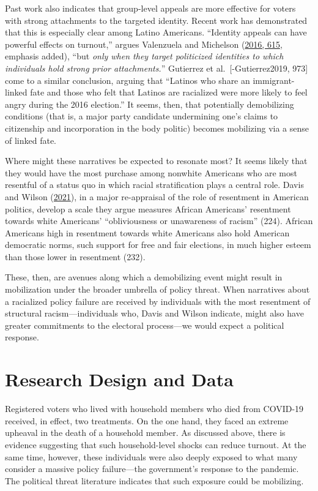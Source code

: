 \documentclass[
  12pt,
]{article}
\begin{document}
Past work also indicates that group-level appeals are more effective for voters with strong attachments to the targeted identity. Recent work has demonstrated that this is especially clear among Latino Americans. ``Identity appeals can have powerful effects on turnout,'' argues Valenzuela and Michelson (\protect\hyperlink{ref-Valenzuela2016}{2016, 615}, emphasis added), ``but \emph{only when they target politicized identities to which individuals hold strong prior attachments.}'' Gutierrez et al.~{[}-Gutierrez2019, 973{]} come to a similar conclusion, arguing that ``Latinos who share an immigrant-linked fate and those who felt that Latinos are racialized were more likely to feel angry during the 2016 election.'' It seems, then, that potentially demobilizing conditions (that is, a major party candidate undermining one's claims to citizenship and incorporation in the body politic) becomes mobilizing via a sense of linked fate.

Where might these narratives be expected to resonate most? It seems likely that they would have the most purchase among nonwhite Americans who are most resentful of a status quo in which racial stratification plays a central role. Davis and Wilson (\protect\hyperlink{ref-Davis2021}{2021}), in a major re-appraisal of the role of resentment in American politics, develop a scale they argue measures African Americans' resentment towards white Americans' ``obliviousness or unawareness of racism'' (224). African Americans high in resentment towards white Americans also hold American democratic norms, such support for free and fair elections, in much higher esteem than those lower in resentment (232).

These, then, are avenues along which a demobilizing event might result in mobilization under the broader umbrella of policy threat. When narratives about a racialized policy failure are received by individuals with the most resentment of structural racism---individuals who, Davis and Wilson indicate, might also have greater commitments to the electoral process---we would expect a political response.

\hypertarget{research-design-and-data}{%
\section*{Research Design and Data}\label{research-design-and-data}}

Registered voters who lived with household members who died from COVID-19 received, in effect, two treatments. On the one hand, they faced an extreme upheaval in the death of a household member. As discussed above, there is evidence suggesting that such household-level shocks can reduce turnout. At the same time, however, these individuals were also deeply exposed to what many consider a massive policy failure---the government's response to the pandemic. The political threat literature indicates that such exposure could be mobilizing.
\end{document}
